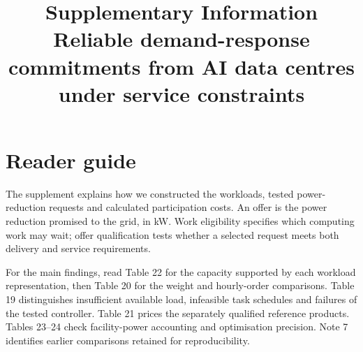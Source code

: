 \documentclass[10pt,a4paper]{article}
\title{\sffamily\bfseries Supplementary Information\\[0.8em]\Large Reliable demand-response commitments from AI data centres under service constraints}
\author{\sffamily [AUTHOR NAMES]}
\date{}
\begin{document}
\maketitle
\thispagestyle{fancy}

\clearpage
{\fontsize{9}{10}\selectfont\setlength{\parskip}{0pt}\tableofcontents}
\clearpage
\section{Reader guide}

The supplement explains how we constructed the workloads, tested power-reduction requests and calculated participation costs. An offer is the power reduction promised to the grid, in kW. Work eligibility specifies which computing work may wait; offer qualification tests whether a selected request meets both delivery and service requirements.


For the main findings, read Table 22 for the capacity supported by each workload representation, then Table 20 for the weight and hourly-order comparisons. Table 19 distinguishes insufficient available load, infeasible task schedules and failures of the tested controller. Table 21 prices the separately qualified reference products. Tables 23–24 check facility-power accounting and optimisation precision. Note 7 identifies earlier comparisons retained for reproducibility.
\end{document}

